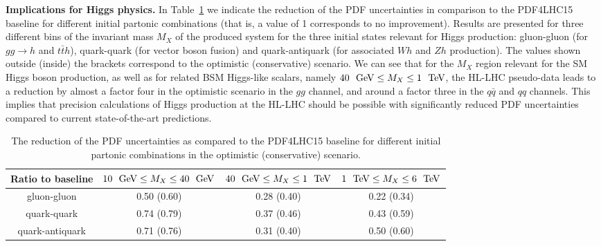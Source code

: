 {\bf Implications for Higgs physics.}
%
In Table~\ref{fig:PDFs-HL--LHC-summaryTable} we indicate
the reduction of the PDF uncertainties
in comparison to the PDF4LHC15 baseline for
different initial partonic combinations (that is, a value
of 1 corresponds to no improvement).
  Results are presented for three different bins
  of the invariant mass $M_X$ of the produced system for
  the three initial states relevant for Higgs production:
  gluon-gluon (for $gg\to h$ and $t\bar{t}h$), quark-quark
  (for vector boson fusion) and quark-antiquark
  (for associated $Wh$ and $Zh$ production).
  The values shown outside (inside) the brackets correspond to the
  optimistic (conservative) scenario.
  We can see that for the $M_X$ region relevant for the SM Higgs
  boson production, as well as for related BSM Higgs-like scalars, namely
  $40~{\rm ~\text{GeV}}\le M_X\le 1~{\rm ~\text{TeV}}$, the HL-LHC pseudo-data leads
  to a reduction by almost a factor four in the optimistic scenario
  in the $gg$ channel, and around a factor three in the $q\bar{q}$
  and $qq$ channels.
  This implies that precision calculations of Higgs production
  at the HL-LHC should be possible with significantly reduced PDF
  uncertainties compared to current state-of-the-art predictions.
  
\begin{table}[t]
  \begin{center}
  \small
   \renewcommand{\arraystretch}{1.70}
\begin{tabular}{c|c|c|c}
\toprule
Ratio to baseline  & $10~{\rm ~\text{GeV}}\le M_X\le 40~{\rm ~\text{GeV}}$   &
 $40~{\rm ~\text{GeV}}\le M_X\le 1~{\rm ~\text{TeV}}$&
  $1~{\rm ~\text{TeV}}\le M_X\le 6~{\rm ~\text{TeV}}$\\
\midrule
gluon-gluon & 0.50 (0.60)  & 0.28 (0.40)  & 0.22 (0.34)     \\
quark-quark &  0.74 (0.79) & 0.37 (0.46) &  0.43 (0.59)     \\
quark-antiquark & 0.71 (0.76) & 0.31 (0.40)  &  0.50 (0.60)     \\
\bottomrule
\end{tabular}
\vspace{+0.4cm}
\caption{\small The reduction of the PDF uncertainties
as compared to the PDF4LHC15 baseline for
different initial partonic combinations in the 
  optimistic (conservative) scenario.
     \label{fig:PDFs-HL--LHC-summaryTable}
 }
  \end{center}
\end{table}

